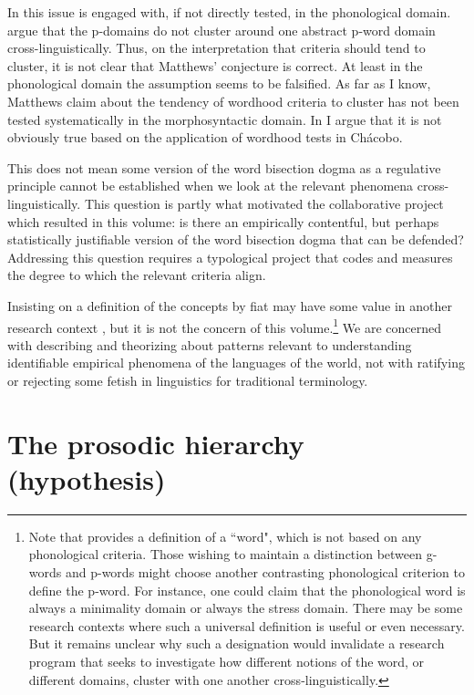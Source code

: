 \documentclass[output=paper,hidelinks]{langscibook}
\begin{document}
In \citet{bickel2009distribution} this issue is engaged with, if not directly tested, in the phonological domain. \citet{bickel2009distribution} argue that the p-domains do not cluster around one abstract p-word domain cross-linguistically. Thus, on the interpretation that criteria should tend to cluster, it is not clear that Matthews' conjecture is correct. At least in the phonological domain the assumption seems to be falsified. As far as I know, Matthews claim about the tendency of wordhood criteria to cluster has not been tested systematically in the morphosyntactic domain. In \cite{tallman2021constituency} I argue that it is not obviously true based on the application of wordhood tests in Chácobo. 

This does not mean some version of the word bisection dogma as a regulative principle cannot be established when we look at the relevant phenomena cross-linguistically. This question is partly what motivated the collaborative project which resulted in this volume: is there an empirically contentful, but perhaps statistically justifiable version of the word bisection dogma that can be defended? Addressing this question requires a typological project that codes and measures the degree to which the relevant criteria align.

Insisting on a definition of the concepts by fiat may have some value in another research context \citep{haspelmath2022defining}, but it is not the concern of this volume.\footnote{Note that \citet{haspelmath2022defining} provides a definition of a ``word", which is not based on any phonological criteria. Those wishing to maintain a distinction between g-words and p-words might choose another contrasting phonological criterion to define the p-word. For instance, one could claim that the phonological word is always a minimality domain or always the stress domain. There may be some research contexts where such a universal definition is useful or even necessary. But it remains unclear why such a designation would invalidate a research program that seeks to investigate how different notions of the word, or different domains, cluster with one another cross-linguistically.} We are concerned with describing and theorizing about patterns relevant to understanding identifiable empirical phenomena of the languages of the world, not with ratifying or rejecting some fetish in linguistics for traditional terminology.

\section{The prosodic hierarchy (hypothesis)}
\label{sec:theprosodichierarchyhypothesis}
\end{document}
